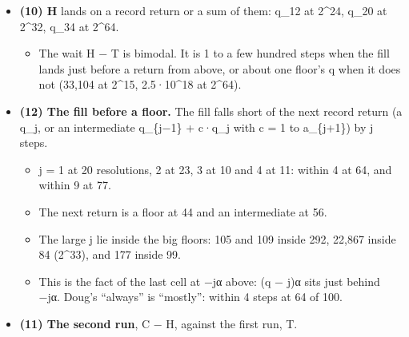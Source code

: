 \begin{itemize}
\item \textbf{(10) H} lands on a record return or a sum of them: q\_\allowbreak{}12 at 2\textasciicircum{}24, q\_\allowbreak{}20 at 2\textasciicircum{}32, q\_\allowbreak{}34 at 2\textasciicircum{}64.

\begin{itemize}
\item The wait H − T is bimodal. It is 1 to a few hundred steps when the fill lands just before a return from above, or about one floor's q when it does not (33,104 at 2\textasciicircum{}15, 2.5·10\textasciicircum{}18 at 2\textasciicircum{}64).
\end{itemize}
\item \textbf{(12) The fill before a floor.} The fill falls short of the next record return (a q\_\allowbreak{}j, or an intermediate q\_\allowbreak{}\{j−1\} + c·q\_\allowbreak{}j with c = 1 to a\_\allowbreak{}\{j+1\}) by j steps.

\begin{itemize}
\item j = 1 at 20 resolutions, 2 at 23, 3 at 10 and 4 at 11: within 4 at 64, and within 9 at 77.
\item The next return is a floor at 44 and an intermediate at 56.
\item The large j lie inside the big floors: 105 and 109 inside 292, 22,867 inside 84 (2\textasciicircum{}33), and 177 inside 99.
\item This is the fact of the last cell at −jα above: (q − j)α sits just behind −jα. Doug's “always” is “mostly”: within 4 steps at 64 of 100.
\end{itemize}
\item \textbf{(11) The second run}, C − H, against the first run, T.


\end{itemize}

